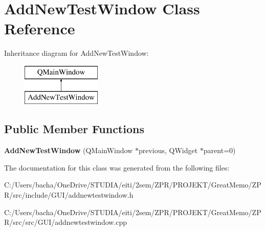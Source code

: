 \hypertarget{class_add_new_test_window}{}\section{Add\+New\+Test\+Window Class Reference}
\label{class_add_new_test_window}
Inheritance diagram for Add\+New\+Test\+Window\+:\begin{figure}[H]
\begin{center}
\leavevmode
\includegraphics[height=2.000000cm]{class_add_new_test_window}
\end{center}
\end{figure}
\subsection*{Public Member Functions}
\begin{DoxyCompactItemize}
\item 
\mbox{\label{class_add_new_test_window_a3c79f0e1fe55a57c13c7e52951e1f2a9}} 
{\bfseries Add\+New\+Test\+Window} (Q\+Main\+Window $\ast$previous, Q\+Widget $\ast$parent=0)
\end{DoxyCompactItemize}


The documentation for this class was generated from the following files\+:\begin{DoxyCompactItemize}
\item 
C\+:/\+Users/bacha/\+One\+Drive/\+S\+T\+U\+D\+I\+A/eiti/2sem/\+Z\+P\+R/\+P\+R\+O\+J\+E\+K\+T/\+Great\+Memo/\+Z\+P\+R/src/include/\+G\+U\+I/addnewtestwindow.\+h\item 
C\+:/\+Users/bacha/\+One\+Drive/\+S\+T\+U\+D\+I\+A/eiti/2sem/\+Z\+P\+R/\+P\+R\+O\+J\+E\+K\+T/\+Great\+Memo/\+Z\+P\+R/src/src/\+G\+U\+I/addnewtestwindow.\+cpp\end{DoxyCompactItemize}
